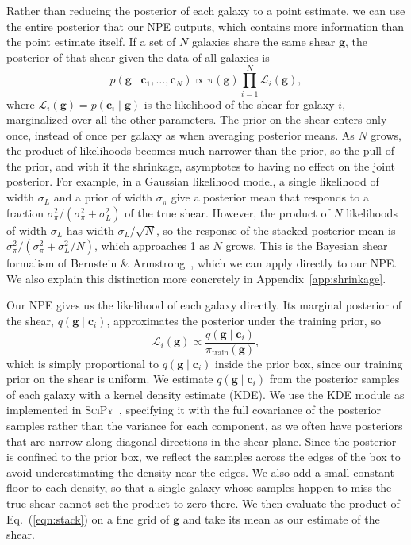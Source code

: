 Rather than reducing the posterior of each galaxy to a point estimate, we can use the entire posterior that our NPE outputs, which contains more information than the point estimate itself. If a set of $N$ galaxies share the same shear $\mathbf{g}$, the posterior of that shear given the data of all galaxies is
\begin{equation}
\label{eqn:stack}
    p(\mathbf{g} \mid \mathbf{c}_1, \dots, \mathbf{c}_N) \propto \pi(\mathbf{g}) \prod_{i=1}^{N} \mathcal{L}_i(\mathbf{g}),
\end{equation}
where $\mathcal{L}_i(\mathbf{g}) = p(\mathbf{c}_i \mid \mathbf{g})$ is the likelihood of the shear for galaxy $i$, marginalized over all the other parameters. The prior on the shear enters only once, instead of once per galaxy as when averaging posterior means. As $N$ grows, the product of likelihoods becomes much narrower than the prior, so the pull of the prior, and with it the shrinkage, asymptotes to having no effect on the joint posterior. For example, in a Gaussian likelihood model, a single likelihood of width $\sigma_L$ and a prior of width $\sigma_\pi$ give a posterior mean that responds to a fraction $\sigma_\pi^2/(\sigma_\pi^2 + \sigma_L^2)$ of the true shear. However, the product of $N$ likelihoods of width $\sigma_L$ has width $\sigma_L/\sqrt{N}$, so the response of the stacked posterior mean is $\sigma_\pi^2/(\sigma_\pi^2 + \sigma_L^2/N)$, which approaches 1 as $N$ grows. This is the Bayesian shear formalism of Bernstein \& Armstrong~\citep{BA14}, which we can apply directly to our NPE. We also explain this distinction more concretely in Appendix~\ref{app:shrinkage}.

Our NPE gives us the likelihood of each galaxy directly. Its marginal posterior of the shear, $q(\mathbf{g} \mid \mathbf{c}_i)$, approximates the posterior under the training prior, so
\begin{equation}
\label{eqn:npe-likelihood}
    \mathcal{L}_i(\mathbf{g}) \propto \frac{q(\mathbf{g} \mid \mathbf{c}_i)}{\pi_\mathrm{train}(\mathbf{g})},
\end{equation}
which is simply proportional to $q(\mathbf{g} \mid \mathbf{c}_i)$ inside the prior box, since our training prior on the shear is uniform. We estimate $q(\mathbf{g} \mid \mathbf{c}_i)$ from the posterior samples of each galaxy with a kernel density estimate (KDE). We use the KDE module as implemented in \textsc{SciPy}~\citep{SciPy}, specifying it with the full covariance of the posterior samples rather than the variance for each component, as we often have posteriors that are narrow along diagonal directions in the shear plane. Since the posterior is confined to the prior box, we reflect the samples across the edges of the box to avoid underestimating the density near the edges. We also add a small constant floor to each density, so that a single galaxy whose samples happen to miss the true shear cannot set the product to zero there. We then evaluate the product of Eq.~(\ref{eqn:stack}) on a fine grid of $\mathbf{g}$ and take its mean as our estimate of the shear.

